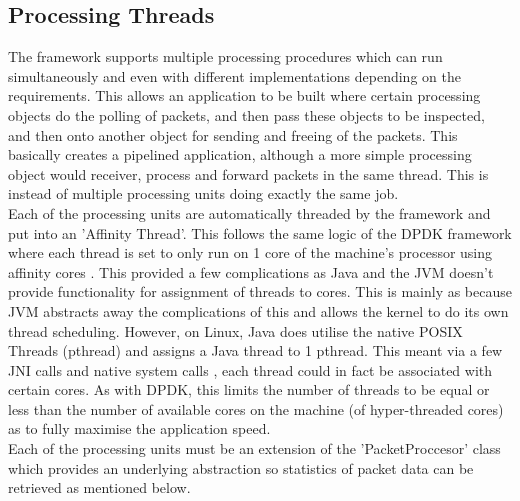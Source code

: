 \documentclass[final_report.tex]{subfiles}
\begin{document}
\subsection{Processing Threads}
The framework supports multiple processing procedures which can run simultaneously and even with different implementations depending on the requirements. This allows an application to be built where certain processing objects do the polling of packets, and then pass these objects to be inspected, and then onto another object for sending and freeing of the packets. This basically creates a pipelined application, although a more simple processing object would receiver, process and forward packets in the same thread. This is instead of multiple processing units doing exactly the same job. \\
\newline
Each of the processing units are automatically threaded by the framework and put into an 'Affinity Thread'. This follows the same logic of the DPDK framework where each thread is set to only run on 1 core of the machine's processor using affinity cores . This provided a few complications as Java and the JVM doesn't provide functionality for assignment of threads to cores. This is mainly as because JVM abstracts away the complications of this and allows the kernel to do its own thread scheduling. However, on Linux, Java does utilise the native POSIX Threads (pthread) and assigns a Java thread to 1 pthread. This meant via a few JNI calls and native system calls , each thread could in fact be associated with certain cores. As with DPDK, this limits the number of threads to be equal or less than the number of available cores on the machine (of hyper-threaded cores) as to fully maximise the application speed. \\
\newline
Each of the processing units must be an extension of the 'PacketProccesor' class which provides an underlying abstraction so statistics of packet data can be retrieved as mentioned below.
\end{document}
